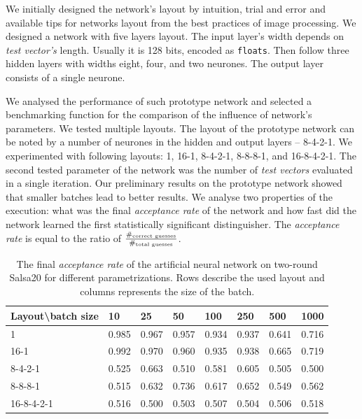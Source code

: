 \documentclass[
    digital,    %
    oneside,    %
    color,
    11pt,
    nocover,
    notable,
    nolof,
    nolot,
]{fithesis3}
\begin{document}
We initially designed the network's layout by intuition, trial and error and available tips for networks layout from the best practices of image processing. We designed a network with five layers layout. The input layer's width depends on \textit{test vector's} length. Usually it is 128 bits, encoded as \texttt{floats}. Then follow three hidden layers with widths eight, four, and two neurones. The output layer consists of a single neurone.

We analysed the performance of such prototype network and selected a benchmarking function for the comparison of the influence of network's parameters. We tested multiple layouts. The layout of the prototype network can be noted by a number of neurones in the hidden and output layers -- 8-4-2-1. We experimented with following layouts: 1, 16-1, 8-4-2-1, 8-8-8-1, and 16-8-4-2-1. The second tested parameter of the network was the number of \textit{test vectors} evaluated in a single iteration. Our preliminary results on the prototype network showed that smaller batches lead to better results. We analyse two properties of the execution: what was the final \textit{acceptance rate} of the network and how fast did the network learned the first statistically significant distinguisher. The \textit{acceptance rate} is equal to the ratio of $\frac{\#_{\textnormal{correct guesses}}}{\#_{\textnormal{total guesses}}}$.

\begin{table}[b]
\centering
\begin{tabular}{l|l l l l l l l}
\textbf{\large Layout\textbackslash{}batch size} & \textbf{\large 10} & \textbf{\large 25} & \textbf{\large 50} & \textbf{\large 100} & \textbf{\large 250} & \textbf{\large 500} & \textbf{\large 1000}\\ \hline
1          & 0.985 & 0.967 & 0.957 & 0.934 & 0.937 & 0.641 & 0.716 \\
16-1       & 0.992 & 0.970 & 0.960 & 0.935 & 0.938 & 0.665 & 0.719 \\
8-4-2-1    & 0.525 & 0.663 & 0.510 & 0.581 & 0.605 & 0.505 & 0.500 \\
8-8-8-1    & 0.515 & 0.632 & 0.736 & 0.617 & 0.652 & 0.549 & 0.562 \\
16-8-4-2-1 & 0.516 & 0.500 & 0.503 & 0.507 & 0.504 & 0.506 & 0.518  
\end{tabular}
\caption{The final \textit{acceptance rate} of the artificial neural network on two-round Salsa20 for different parametrizations. Rows describe the used layout and columns represents the size of the batch.}
\label{table:res-ann-acc}
\end{table}
\end{document}
